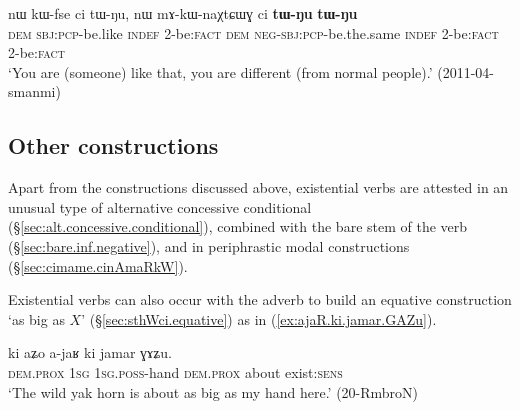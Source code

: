 \begin{exe}
\ex \label{ex:tWNu.tWNu}
\gll nɯ kɯ-fse ci tɯ-ŋu, nɯ mɤ-kɯ-naχtɕɯɣ ci \textbf{tɯ-ŋu} \textbf{tɯ-ŋu} \\
\textsc{dem} \textsc{sbj}:\textsc{pcp}-be.like \textsc{indef} 2-be:\textsc{fact} \textsc{dem} \textsc{neg}-\textsc{sbj}:\textsc{pcp}-be.the.same \textsc{indef} 2-be:\textsc{fact} 2-be:\textsc{fact} \\
\glt `You are (someone) like that, you are different (from normal people).' (2011-04-smanmi)
\end{exe}



\subsection{Other constructions}
Apart from the constructions discussed above, existential verbs are attested in an unusual type of alternative concessive conditional (§\ref{sec:alt.concessive.conditional}), combined with the bare stem of the verb (§\ref{sec:bare.inf.negative}), and in periphrastic modal constructions (§\ref{sec:cimame.cinAmaRkW}).
 
 Existential verbs can also occur with the adverb  to build an equative construction `as big as $X$' (§\ref{sec:sthWci.equative}) as in (\ref{ex:ajaR.ki.jamar.GAZu}).  

\begin{exe}
\ex \label{ex:ajaR.ki.jamar.GAZu}
\gll ki aʑo a-jaʁ ki jamar ɣɤʑu. \\
\textsc{dem}.\textsc{prox} \textsc{1sg} \textsc{1sg}.\textsc{poss}-hand \textsc{dem}.\textsc{prox} about exist:\textsc{sens} \\
\glt `The wild yak horn is about as big as my hand here.' (20-RmbroN)
 \end{exe}


